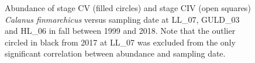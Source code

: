 \documentclass[12pt]{article}\usepackage[]{graphicx}\usepackage[]{color}
\begin{document}
\begin{figure}[htb]

{\centering {} 

}

\caption{Abundance of stage CV (filled circles) and stage CIV (open squares) \emph{Calanus finmarchicus} versus sampling date at LL\_07, GULD\_03 and HL\_06 in fall between 1999 and 2018. Note that the outlier circled in black from 2017 at LL\_07 was excluded from the only significant correlation between abundance and sampling date.}\label{fig:figure34}
\end{figure}
\clearpage
\end{document}
